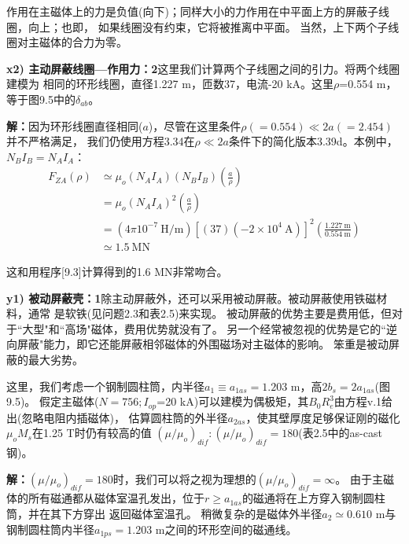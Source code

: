 作用在主磁体上的力是负值(向下)；同样大小的力作用在中平面上方的屏蔽子线圈，向上；也即，
如果线圈没有约束，它将被推离中平面。
当然，上下两个子线圈对主磁体的合力为零。

\textbf{x2) 主动屏蔽线圈---作用力：2}\qquad 这里我们计算两个子线圈之间的引力。将两个线圈建模为
相同的环形线圈，直径1.227 m，匝数37，电流-20 kA。这里$\rho$=0.554 m，等于图9.5中的$\delta_{ab}$。

\textbf{解：}因为环形线圈直径相同($a$)，尽管在这里条件$\rho(=0.554)\ll 2a(=2.454)$并不严格满足，
我们仍使用方程3.34在$\rho\ll 2a$条件下的简化版本3.39d。本例中，$N_B I_B=N_A I_A$：
\begin{align*}%
F_{ZA}(\rho)&\simeq\mu_o(N_AI_A)(N_BI_B)(\frac{a}{\rho})\\ \tag{3.39d}
&=\mu_o(N_AI_A)^2(\frac{a}{\rho})\\
&=(4\pi10^{-7}\ \mathrm{H/m})[(37)(-2\times 10^4\ \mathrm{A})]^2(\frac{1.227\ \mathrm{m}}{0.554\ \mathrm{m}})\\
&\simeq 1.5\ \mathrm{MN}
\end{align*}

这和用程序[9.3]计算得到的1.6 MN非常吻合。

\textbf{y1) 被动屏蔽壳：1}\qquad 除主动屏蔽外，还可以采用被动屏蔽。被动屏蔽使用铁磁材料，通常
是软铁(见问题2.3和表2.5)来实现。
被动屏蔽的优势主要是费用低，但对于``大型"和``高场"磁体，费用优势就没有了。
另一个经常被忽视的优势是它的``逆向屏蔽"能力，即它还能屏蔽相邻磁体的外围磁场对主磁体的影响。
笨重是被动屏蔽的最大劣势。

这里，我们考虑一个钢制圆柱筒，内半径$a_1\equiv a_{1as}=1.203$ m，高$2b_s=2a_{1as}$(图9.5)。
假定主磁体($N=756;I_{op}$=20 kA)可以建模为偶极矩，其$B_0R_e^3$由方程v.1给出(忽略电阻内插磁体)，
估算圆柱筒的外半径$a_{2as}$，使其壁厚度足够保证刚的磁化$\mu_o M_s$在1.25 T时仍有较高的值
$(\mu/\mu_o)_{dif}:(\mu/\mu_o)_{dif}=180$(表2.5中的as-cast钢)。

\textbf{解：}$(\mu/\mu_o)_{dif}=180$时，我们可以将之视为理想的$(\mu/\mu_o)_{dif}=\infty$。
由于主磁体的所有磁通都从磁体室温孔发出，位于$r\ge a_{1as}$的磁通将在上方穿入钢制圆柱筒，并在其下方穿出
返回磁体室温孔。
稍微复杂的是磁体外半径$a_2\simeq0.610$ m与钢制圆柱筒内半径$a_{1ps}=1.203$ m之间的环形空间的磁通线。

